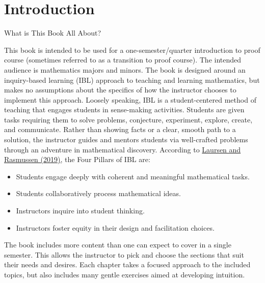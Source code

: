 \chapter{Introduction}\label{chap:intro}


\begin{section}{What is This Book All About?}%

This book is intended to be used for a one-semester/quarter introduction to proof course (sometimes referred to as a transition to proof course). The intended audience is mathematics majors and minors. The book is designed around an inquiry-based learning (IBL) approach to teaching and learning mathematics, but makes no assumptions about the specifics of how the instructor chooses to implement this approach.  Loosely speaking, IBL is a student-centered method of teaching that engages students in sense-making activities.  Students are given tasks requiring them to solve problems, conjecture, experiment, explore, create, and communicate.  Rather than showing facts or a clear, smooth path to a solution, the instructor guides and mentors students via well-crafted problems through an adventure in mathematical discovery.  According to \href{https://www.colorado.edu/eer/sites/default/files/attached-files/laursenrasmussencommentaryauthorversion0219.pdf}{Laursen and Rasmussen (2019)}, the Four Pillars of IBL are:
\begin{itemize}
\item Students engage deeply with coherent and meaningful mathematical tasks.
\item Students collaboratively process mathematical ideas.
\item Instructors inquire into student thinking.
\item Instructors foster equity in their design and facilitation choices.
\end{itemize}

The book includes more content than one can expect to cover in a single semester. This allows the instructor to pick and choose the sections that suit their needs and desires. Each chapter takes a focused approach to the included topics, but also includes many gentle exercises aimed at developing intuition.


\end{section}
